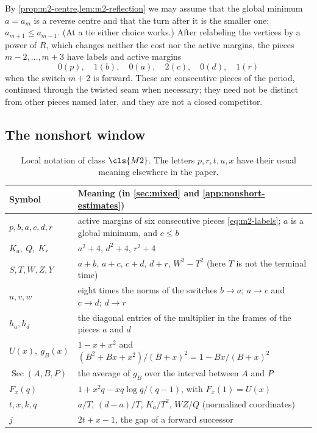 By \cref{prop:m2-centre,lem:m2-reflection} we may assume that the global minimum $a=a_m$ is a
reverse centre and that the turn after it is the smaller one: $a_{m+1}\le a_{m-1}$. (At a tie either
choice works.) After relabeling the vertices by a power of $R$, which changes neither the cost nor
the active margins, the pieces $m-2,\dots,m+3$ have labels and active margins
\begin{equation}\label{eq:m2-labels}
0(p),\quad 1(b),\quad 0(a),\quad 2(c),\quad 0(d),\quad 1(r)
\end{equation}
when the switch $m+2$ is forward.
These are consecutive pieces of the period, continued through the twisted seam when necessary; they
need not be distinct from other pieces named later, and they are not a closed competitor.

\subsection{The nonshort window}\label{sec:m2-window}

\begin{table}[t]
\centering\small
\begin{tabular}{@{}l>{\raggedright\arraybackslash}p{}@{}}
\toprule
Symbol & Meaning (in \cref{sec:mixed} and \cref{app:nonshort-estimates})\\
\midrule
$p,b,a,c,d,r$ & active margins of six consecutive pieces \eqref{eq:m2-labels}; $a$ is a global
minimum, and $c\le b$\\
$K_a,\ Q,\ K_r$ & $a^2+4$, $d^2+4$, $r^2+4$\\
$S,T,W,Z,Y$ & $a+b$, $a+c$, $c+d$, $d+r$, $W^2-T^2$ (here $T$ is not the terminal time)\\
$u,v,w$ & eight times the norms of the switches $b\to a$; $a\to c$ and $c\to d$; $d\to r$\\
$h_a,h_d$ & the diagonal entries of the multiplier in the frames of the pieces $a$ and $d$\\
$U(x),\ g_B(x)$ & $1-x+x^2$ and $(B^2+Bx+x^2)/(B+x)^2=1-Bx/(B+x)^2$\\
$\operatorname{Sec}(A,B,P)$ & the average of $g_B$ over the interval between $A$ and $P$\\
$F_x(q)$ & $1+x^2q-xq\log q/(q-1)$, with $F_x(1)=U(x)$\\
$t,x,k,q$ & $a/T$, $(d-a)/T$, $K_a/T^2$, $WZ/Q$ (normalized coordinates)\\
$j$ & $2t+x-1$, the gap of a forward successor\\
\bottomrule
\end{tabular}
\caption{Local notation of class $\cls{M2}$. The letters $p,r,t,u,x$ have their usual meaning
elsewhere in the paper.}\label{tab:m2-notation}
\end{table}

